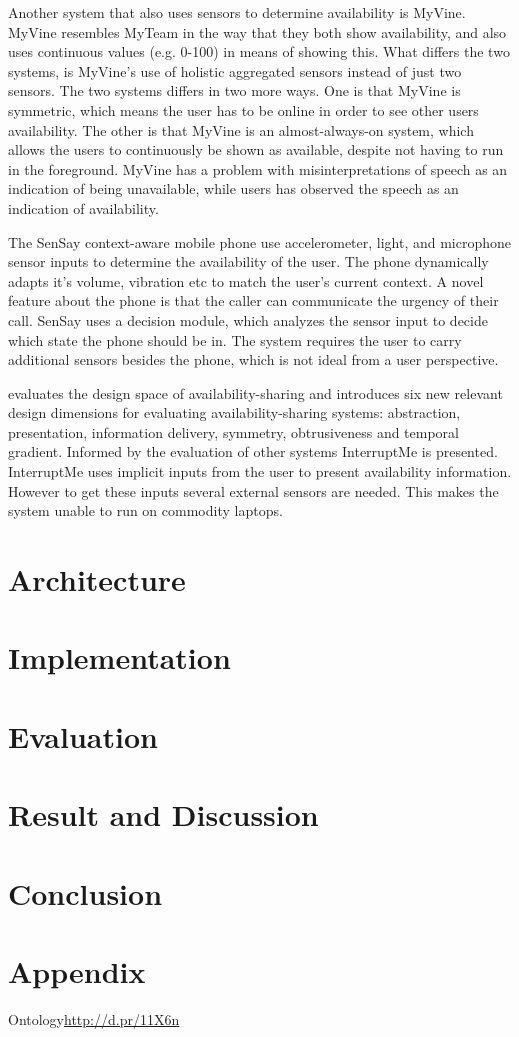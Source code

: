 \documentclass{sigchi}
\begin{document}
Another system that also uses sensors to determine availability is MyVine. MyVine resembles MyTeam in the way that they both show availability, and also uses continuous values (e.g. 0-100) in means of showing this. What differs the two systems, is MyVine’s use of holistic aggregated sensors instead of just two sensors. The two systems differs in two more ways. One is that MyVine is symmetric, which means the user has to be online in order to see other users availability. The other is that MyVine is an almost-always-on system, which allows the users to continuously be shown as available, despite not having to run in the foreground.
MyVine has a problem with misinterpretations of speech as an indication of being unavailable, while users has observed the speech as an indication of availability.

The SenSay context-aware mobile phone\cite{siewiorek2003sensay} use accelerometer, light, and microphone sensor inputs to determine the availability of the user. The phone dynamically adapts it’s volume, vibration etc to match the user's current context. A novel feature about the phone is that the caller can communicate the urgency of their call. SenSay uses a decision module, which analyzes the sensor input to decide which state the phone should be in. The system requires the user to carry additional sensors besides the phone, which is not ideal from a user perspective.

\cite{Ramos2011} evaluates the design space of availability-sharing and introduces six new relevant design dimensions for evaluating availability-sharing systems: abstraction, presentation, information delivery, symmetry, obtrusiveness and temporal gradient. Informed by the evaluation of other systems InterruptMe is presented. InterruptMe uses implicit inputs from the user to present availability information. However to get these inputs several external sensors are needed. This makes the system unable to run on commodity laptops.

\section{Architecture}

\section{Implementation}

\section{Evaluation}

\section{Result and Discussion}

\section{Conclusion}

\balance



\section{Appendix}
Ontology\url{http://d.pr/11X6n}
\end{document}

